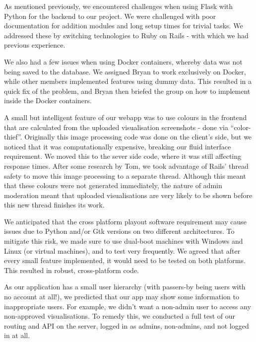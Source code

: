\documentclass[a4paper, titlepage]{article}
\begin{document}
As mentioned previously, we encountered challenges when using Flask with Python for the backend to our 
project. We were challenged with poor documentation for addition modules and long setup times for 
trivial tasks. We addressed these by switching technologies to Ruby on Rails - with which we had 
previous experience. 

We also had a few issues when using Docker containers, whereby data was not being saved to the database.
We assigned Bryan to work exclusively on Docker, while other members implemented features using dummy 
data. This resulted in a quick fix of the problem, and Bryan then briefed the group on how to implement
inside the Docker containers. 

A small but intelligent feature of our webapp was to use colours in the frontend that are calculated 
from the uploaded visualisation screenshots - done via ``color-thief''. Originally this image
processing code was done on the client's side, but we noticed that it was computationally expensive,
breaking our fluid interface requirement. We moved this to the sever side code, where it was still 
affecting response times. After some research by Tom, we took advantage of Rails' thread safety to move
this image processing to a separate thread. Although this meant that these colours were not generated 
immediately, the nature of admin moderation meant that uploaded visualisations are very likely to be 
shown before this new thread finishes its work.



We anticipated that the cross platform playout software requirement may cause issues due to Python
and/or Gtk versions on two different architectures. To mitigate this risk, we made sure to use dual-boot
machines with Windows and Linux (or virtual machines), and to test very frequently. We agreed that after
every small feature implemented, it would need to be tested on both platforms. This resulted in robust, 
cross-platform code.


As our application has a small user hierarchy (with passers-by being users with no account at all!), we 
predicted that our app may show some information to inappropriate users. For example, we didn't want a 
non-admin user to access any non-approved visualisations. To remedy this, we conducted a full test of
our routing and API on the server, logged in as admins, non-admins, and not logged in at all. 
\end{document}

